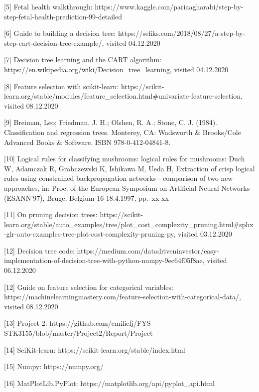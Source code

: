 \documentclass[11pt]{article}
\begin{document}
{[}5{]} Fetal health walkthrough:
https://www.kaggle.com/pariaagharabi/step-by-step-fetal-health-prediction-99-detailed

{[}6{]} Guide to building a decision tree:
https://sefiks.com/2018/08/27/a-step-by-step-cart-decision-tree-example/,
visited 04.12.2020

{[}7{]} Decision tree learning and the CART algorithm:
https://en.wikipedia.org/wiki/Decision\_tree\_learning, visited
04.12.2020

{[}8{]} Feature selection with scikit-learn:
https://scikit-learn.org/stable/modules/feature\_selection.html\#univariate-feature-selection,
visited 08.12.2020

{[}9{]} Breiman, Leo; Friedman, J. H.; Olshen, R. A.; Stone, C. J.
(1984). Classification and regression trees. Monterey, CA: Wadsworth \&
Brooks/Cole Advanced Books \& Software. ISBN 978-0-412-04841-8.

{[}10{]} Logical rules for classifying mushrooms: logical rules for
mushrooms: Duch W, Adamczak R, Grabczewski K, Ishikawa M, Ueda H,
Extraction of crisp logical rules using constrained backpropagation
networks - comparison of two new approaches, in: Proc. of the European
Symposium on Artificial Neural Networks (ESANN'97), Bruge, Belgium
16-18.4.1997, pp.~xx-xx

{[}11{]} On pruning decision trees:
https://scikit-learn.org/stable/auto\_examples/tree/plot\_cost\_complexity\_pruning.html\#sphx-glr-auto-examples-tree-plot-cost-complexity-pruning-py,
visited 03.12.2020

{[}12{]} Decision tree code:
https://medium.com/datadriveninvestor/easy-implementation-of-decision-tree-with-python-numpy-9ec64f05f8ae,
visited 06.12.2020

{[}12{]} Guide on feature selection for categorical variables:
https://machinelearningmastery.com/feature-selection-with-categorical-data/,
visited 08.12.2020

[13] Project 2: https://github.com/emiliefj/FYS-STK3155/blob/master/Project2/Report/Project%

{[}14{]} SciKit-learn: https://scikit-learn.org/stable/index.html

{[}15{]} Numpy: https://numpy.org/

{[}16{]} MatPlotLib.PyPlot: https://matplotlib.org/api/pyplot\_api.html
    
    
    
\end{document}
